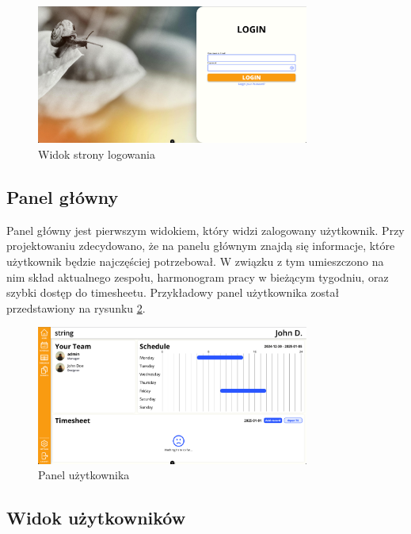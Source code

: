 \begin{figure}[H]
    \centering
    \includegraphics[width=0.8\textwidth, frame]{graf/front/loginPage.png}
    \caption{Widok strony logowania}
    \label{fig:loginPage}
\end{figure}

\subsection{Panel główny}

Panel główny jest pierwszym widokiem, który widzi zalogowany użytkownik. Przy projektowaniu zdecydowano, że na panelu głównym znajdą się informacje, które użytkownik będzie najczęściej potrzebował. W związku z tym umieszczono na nim skład aktualnego zespołu, harmonogram pracy w bieżącym tygodniu, oraz szybki dostęp do timesheetu. Przykładowy panel użytkownika został przedstawiony na rysunku \ref{fig:userDashboard}.

\begin{figure}[H]
    \centering
    \includegraphics[width=0.8\textwidth, frame]{graf/userDashboard.png}
    \caption{Panel użytkownika}
    \label{fig:userDashboard}
\end{figure}

\subsection{Widok użytkowników}

